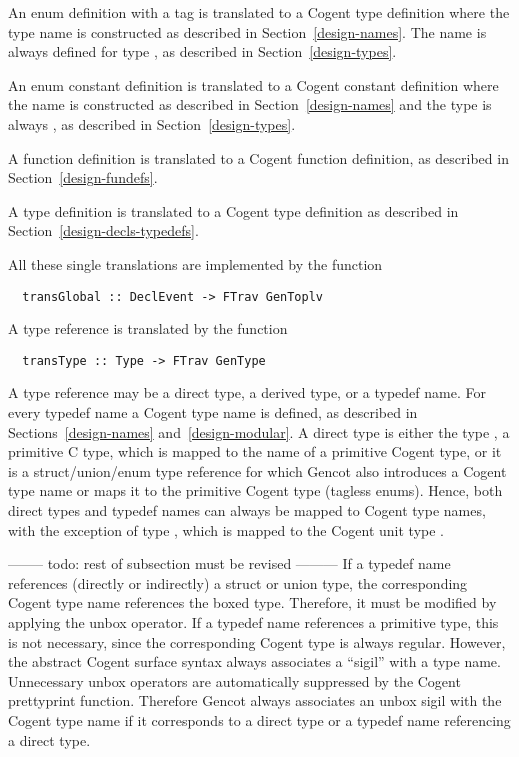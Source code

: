 An enum definition with a tag is translated to a Cogent type definition where the type name is constructed as described 
in Section~\ref{design-names}. The name is always defined for type , as described in Section~\ref{design-types}.

An enum constant definition is translated to a Cogent constant definition where the name is constructed as described 
in Section~\ref{design-names} and the type is always , as described in Section~\ref{design-types}.

A function definition is translated to a Cogent function definition, as described in Section~\ref{design-fundefs}.

A type definition is translated to a Cogent type definition as described in Section~\ref{design-decls-typedefs}.

All these single translations are implemented by the function
\begin{verbatim}
  transGlobal :: DeclEvent -> FTrav GenToplv
\end{verbatim}

A type reference is translated by the function
\begin{verbatim}
  transType :: Type -> FTrav GenType
\end{verbatim}

A type reference may be a direct type, a derived type, or a typedef name. For every typedef name a Cogent type
name is defined, as described in Sections~\ref{design-names} and~\ref{design-modular}. A direct type is either
the type , a primitive C type, which is mapped to the name of a primitive Cogent type, or it is a 
struct/union/enum type reference for which Gencot also introduces a Cogent type name or maps it to the 
primitive Cogent type  (tagless enums). Hence, both direct types and typedef names can always be mapped
to Cogent type names, with the exception of type , which is mapped to the Cogent unit type \code{()}.

-------- todo: rest of subsection must be revised ---------
If a typedef name references (directly or indirectly) a struct or union type, the corresponding Cogent
type name references the boxed type. Therefore, it must be modified by applying the unbox operator. If a typedef
name references a primitive type, this is not necessary, since the corresponding Cogent type is always regular.
However, the abstract Cogent surface syntax always associates a ``sigil'' with a type name. Unnecessary
unbox operators are automatically suppressed by the Cogent prettyprint function. Therefore Gencot always 
associates an unbox sigil with the Cogent type name if it corresponds to a direct type or a typedef name
referencing a direct type.

